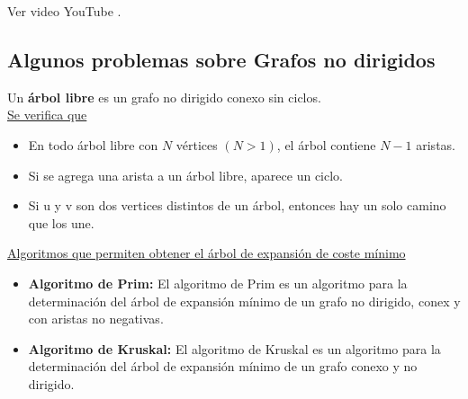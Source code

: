 \documentclass[../main.tex]{subfiles}
\begin{document}
                Ver video YouTube \cite{grafo_algoritmo_warshall_youtube_1}.

    \subsection{Algunos problemas sobre Grafos no dirigidos}
        Un \textbf{árbol libre} es un grafo no dirigido conexo sin ciclos.\\
        
        \underline{Se verifica que}
        \begin{itemize}
            \item En todo árbol libre con $N$ vértices $(N>1)$, el árbol contiene $N-1$ aristas.
            \item Si se agrega una arista a un árbol libre, aparece un ciclo.
            \item Si u y v son dos vertices distintos de un árbol, entonces hay un solo camino que los une.
        \end{itemize}

        \underline{Algoritmos que permiten obtener el árbol de expansión de coste mínimo}
        \begin{itemize}
            \item \textbf{Algoritmo de Prim:} El algoritmo de Prim es un algoritmo para la determinación del árbol de expansión mínimo de un grafo no dirigido, conex y con aristas no negativas.
            \item \textbf{Algoritmo de Kruskal:} El algoritmo de Kruskal es un algoritmo para la determinación del árbol de expansión mínimo de un grafo conexo y no dirigido.
        \end{itemize}
\end{document}
